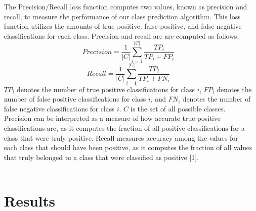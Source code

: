 \documentclass[twoside,11pt]{article}
\begin{document}
The Precision/Recall loss function computes two values, known as precision and recall, to measure the performance of our class prediction algorithm. This loss function utilizes the amounts of true positive, false positive, and false negative classifications for each class. Precision and recall are are computed as follows: 
$$Precision = \frac{1}{|C|} \sum^{|C|}_{i=1} \frac{TP_i}{TP_i + FP_i}$$
$$Recall = \frac{1}{|C|} \sum^{|C|}_{i=1} \frac{TP_i}{TP_i + FN_i}$$
$TP_i$ denotes the number of true positive classifications for class $i$, $FP_i$ denotes the number of false positive classifications for class $i$, and $FN_i$ denotes the number of false negative classifications for class $i$. $C$ is the set of all possible classes. Precision can be interpreted as a measure of how accurate true positive classifications are, as it computes the fraction of all positive classifications for a class that were truly positive. Recall measures accuracy among the values for each class that should have been positive, as it computes the fraction of all values that truly belonged to a class that were classified as positive [1]. \\ \\


\section{Results}





\end{document}
